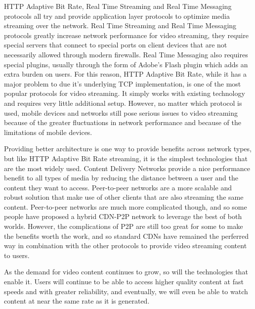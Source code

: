 \documentclass[12pt]{article}
\begin{document}
 HTTP Adaptive Bit Rate, Real Time Streaming and Real Time Messaging protocols all try and provide application layer protocols to optimize media streaming over the network.  Real Time Streaming and Real Time Messaging protocols greatly increase network performance for video streaming, they require special servers that connect to special ports on client devices that are not necessarily allowed through modern firewalls.  Real Time Messaging also requires special plugins, usually through the form of Adobe's Flash plugin which adds an extra burden on users.  For this reason, HTTP Adaptive Bit Rate, while it has a major problem to due it's underlying TCP implementation, is one of the most popular protocols for video streaming.  It simply works with existing technology and requires very little additional setup.  However, no matter which protocol is used, mobile devices and networks still pose serious issues to video streaming because of the greater fluctuations in network performance and because of the limitations of mobile devices.

 Providing better architecture is one way to provide benefits across network types, but like HTTP Adaptive Bit Rate streaming, it is the simplest technologies that are the most widely used.  Content Delivery Networks provide a nice performance benefit to all types of media by reducing the distance between a user and the content they want to access.  Peer-to-peer networks are a more scalable and robust solution that make use of other clients that are also streaming the same content.  Peer-to-peer networks are much more complicated though, and so some people have proposed a hybrid CDN-P2P network to leverage the best of both worlds.  However, the complications of P2P are still too great for some to make the benefits worth the work, and so standard CDNs have remained the perferred way in combination with the other protocols to provide video streaming content to users.

 As the demand for video content continues to grow, so will the technologies that enable it.  Users will continue to be able to access higher quality content at fast speeds and with greater reliability, and eventually, we will even be able to watch content at near the same rate as it is generated.

\clearpage
{}

\end{document}
